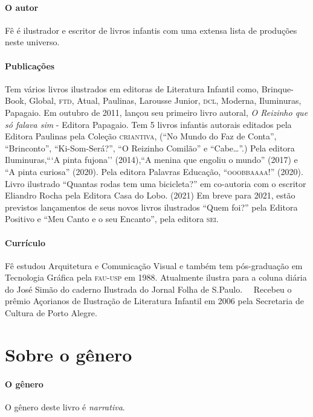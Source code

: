\documentclass[11pt]{extarticle}
\begin{document}
\paragraph{O autor} 
Fê é ilustrador e escritor de livros infantis com uma extensa lista de produções neste universo. 


\paragraph{Publicações} 
Tem vários livros ilustrados em editoras de Literatura
Infantil como, Brinque-Book, Global, \textsc{ftd}, Atual, Paulinas,
Larousse Junior, \textsc{dcl}, Moderna, Iluminuras, Papagaio.
Em outubro de 2011, lançou seu primeiro livro autoral, \textit{O Reizinho que só falava
sim} - Editora Papagaio.
Tem 5 livros infantis autorais editados pela Editora Paulinas pela Coleção
\textsc{criantiva}, (``No Mundo do Faz de Conta'', ``Brinconto'', ``Ki-Som-Será?'', ``O
Reizinho Comilão'' e ``Cabe…''.)
Pela editora Iluminuras,```A pinta fujona'' (2014),``A menina que engoliu o
mundo'' (2017) e ``A pinta curiosa'' (2020).
Pela editora Palavras Educação, ``\textsc{ooobbaaaa}!'' (2020).
Livro ilustrado ``Quantas rodas tem uma bicicleta?'' em co-autoria com o escritor
Eliandro Rocha pela Editora Casa do Lobo. (2021)
Em breve para 2021, estão previstos lançamentos de seus novos livros ilustrados ``Quem foi?''
pela Editora Positivo e ``Meu Canto e o seu Encanto'', pela editora \textsc{sei}.

\paragraph{Currículo} 
Fê estudou Arquitetura e Comunicação Visual e também tem pós-graduação em 
Tecnologia Gráfica pela \textsc{fau-usp} em 1988.
Atualmente ilustra para a coluna diária do José Simão do
caderno Ilustrada do Jornal Folha de S.Paulo. 
Recebeu o prêmio Açorianos de Ilustração de Literatura Infantil em 2006 pela 
Secretaria de Cultura de Porto Alegre.

\section{Sobre o gênero}

\paragraph{O gênero} O gênero deste livro é \textit{narrativa}. 
\end{document}
